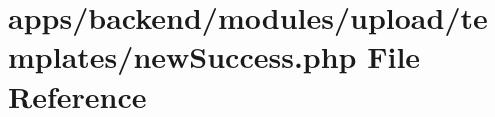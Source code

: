 \hypertarget{backend_2modules_2upload_2templates_2new_success_8php}{\section{apps/backend/modules/upload/templates/new\-Success.php File Reference}
\label{backend_2modules_2upload_2templates_2new_success_8php}
}

